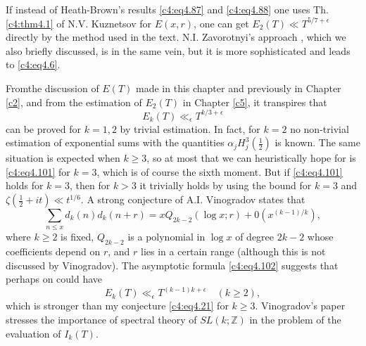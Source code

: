 If instead of Heath-Brown's results \eqref{c4:eq4.87} and
\eqref{c4:eq4.88} one uses Th. \ref{c4:thm4.1}  of N.V. Kuznetsov \cite{Kuznetsov4} for
$E(x, r)$, one can get $E_2 (T) \ll T^{5/7+\epsilon}$ directly by the
method used in the text. N.I. Zavorotnyi's approach \cite{Zavorotnyi1}, which we
also briefly discussed, is in the same vein, but it is more
sophisticated and leads to \eqref{c4:eq4.6}.

From\pageoriginale the discussion of $E(T)$ made in this chapter and
previously in Chapter \ref{c2}, and from the estimation of $E_2(T)$ in
Chapter \ref{c5}, it transpires that
\begin{equation}
  E_k (T) \ll_\epsilon T^{k/3 + \epsilon}\label{c4:eq4.101}
\end{equation}
can be proved for $k=1,2$ by trivial estimation. In fact, for $k=2$ no
non-trivial estimation of exponential sums with the quantities
$\alpha_j H_j^3 (\frac{1}{2})$ is known. The same situation is
expected when $k \geq 3$, so at most that we can heuristically hope
for is \eqref{c4:eq4.101} for $k=3$, which is of course the sixth
moment. But if \eqref{c4:eq4.101} holds for $k=3$, then for $k >3$ it
trivially holds by using the bound for $k=3$ and $\zeta (\frac{1}{2} +
it) \ll t^{1/6}$. A strong conjecture of A.I. Vinogradov \cite{Vinogradov3}
states that 
\begin{equation}
  \sum_{n \leq x}d_k (n) d_k (n+r) = x Q_{2k-2} (\log x; r) +
  0\left(x^{(k-1)/k}\right),\label{c4:eq4.102} 
\end{equation}
where $k \geq 2$ is fixed, $Q_{2k-2}$ is a polynomial in $\log x$ of
degree $2k-2$ whose coefficients depend on $r$, and $r$ lies in a
certain range (although this is not discussed by Vinogradov). The
asymptotic formula \eqref{c4:eq4.102} suggests that perhaps on could
have
$$
E_k (T) \ll_\epsilon T^{(k-1)k+\epsilon}\quad (k \geq 2),
$$
which is stronger than my conjecture \eqref{c4:eq4.21} for $k \geq
3$. Vinogradov's paper \cite{Vinogradov3} stresses the importance of spectral
theory of $SL (k; \mathbb{Z})$ in the problem of the evaluation of
$I_k (T)$.

